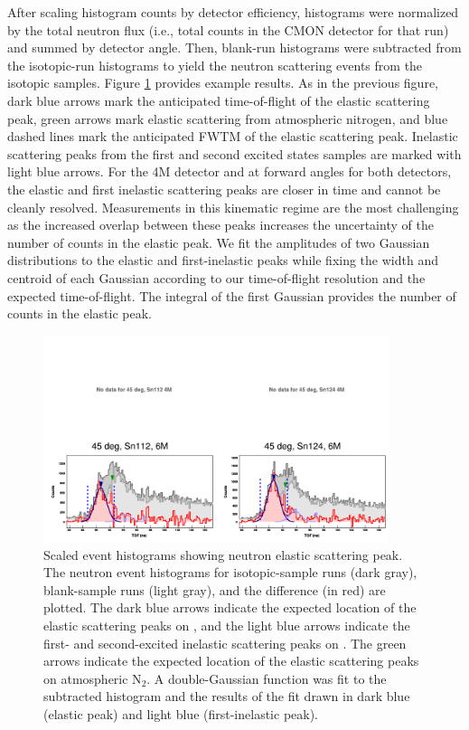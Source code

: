 After scaling histogram counts by detector efficiency, histograms were
normalized by the total neutron flux
(i.e., total counts in the CMON detector for that run) and summed by detector
angle. Then, blank-run histograms
were subtracted from the isotopic-run histograms to yield the neutron scattering
events from the isotopic samples. Figure \ref{tiledAngleData} provides example 
results. As in the previous figure, dark blue arrows mark the anticipated
time-of-flight of the elastic scattering peak, green arrows mark elastic
scattering from atmospheric nitrogen, and blue dashed lines mark the anticipated
FWTM of the elastic scattering peak. Inelastic scattering peaks from the first and
second excited states samples are marked with light blue
arrows. For the 4M detector and at forward angles for both detectors, the elastic and first 
inelastic scattering peaks are closer in time and cannot be cleanly resolved. Measurements in this
kinematic regime are the most challenging as the increased overlap between
these peaks increases the uncertainty of the number of counts in the elastic
peak. We fit the amplitudes of two Gaussian distributions to the elastic and
first-inelastic peaks while fixing
the width and centroid of each Gaussian according to our time-of-flight resolution and
the expected time-of-flight. The integral of the first Gaussian provides the
number of counts in the elastic peak.

\begin{figure}[ht]
    \centering
    \includegraphics[width = 0.9\textwidth]{figures/tiledAngleData.png}
    \caption[Scaled event histograms showing neutron elastic scattering peak]
    {
        Scaled event histograms showing neutron elastic scattering peak. The
        neutron event histograms for isotopic-sample runs (dark gray),
        blank-sample runs (light gray), and the difference (in red) are plotted.
        The dark blue arrows indicate the expected location of the elastic scattering
        peaks on \snTwelveFour, and the light blue arrows indicate the first-
        and second-excited inelastic scattering peaks on \snTwelveFour. The
        green arrows indicate the expected location of the elastic scattering
        peaks on atmospheric N$_{2}$. A double-Gaussian function was fit to the
        subtracted histogram and the results of the fit drawn in dark
        blue (elastic peak) and light blue (first-inelastic peak).
    }
    \label{tiledAngleData}
\end{figure}

